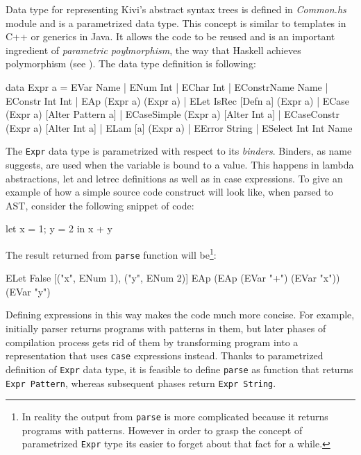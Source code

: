 \documentclass[12pt,a4paper]{report}
\begin{document}
Data type for representing Kivi's abstract syntax trees is defined in
\textit{Common.hs} module and is a parametrized data type. This concept is
similar to templates in C++ or generics in Java. It allows the code to be
reused and is an important ingredient of \textit{parametric poylmorphism}, the
way that Haskell achieves polymorphism (see
\cite{website:parametric_polymorphism}). The data type definition is following:

\vspace*{0.2in}
\begin{code}[style=haskell]
  data Expr a = EVar Name
              | ENum Int
              | EChar Int
              | EConstrName Name
              | EConstr Int Int
              | EAp (Expr a) (Expr a)
              | ELet IsRec [Defn a] (Expr a)
              | ECase (Expr a) [Alter Pattern a]
              | ECaseSimple (Expr a) [Alter Int a]
              | ECaseConstr (Expr a) [Alter Int a]
              | ELam [a] (Expr a)
              | EError String
              | ESelect Int Int Name
\end{code}

The \texttt{Expr} data type is parametrized with respect to its
\textit{binders}. Binders, as name suggests, are used when the variable is
bound to a value. This happens in lambda abstractions, let and letrec
definitions as well as in case expressions. To give an example of how a simple
source code construct will look like, when parsed to AST, consider the
following snippet of code:

\vspace*{0.2in}
\begin{code}[style=haskell]
  let
      x = 1;
      y = 2
  in
      x + y
\end{code}

The result returned from \texttt{parse} function will be\footnote{In reality
the output from \texttt{parse} is more complicated because it returns programs
with patterns. However in order to grasp the concept of parametrized
\texttt{Expr} type its easier to forget about that fact for a while.}:

\vspace*{0.2in}
\begin{code}[style=haskell]
  ELet False
       [("x", ENum 1), ("y", ENum 2)]
       EAp (EAp (EVar "+") (EVar "x")) (EVar "y")
\end{code}

Defining expressions in this way makes the code much more concise. For example,
initially parser returns programs with patterns in them, but later phases of
compilation process gets rid of them by transforming program into a
representation that uses \texttt{case} expressions instead. Thanks to
parametrized definition of \texttt{Expr} data type, it is feasible to define
\texttt{parse} as function that returns \texttt{Expr Pattern}, whereas
subsequent phases return \texttt{Expr String}.
\end{document}

